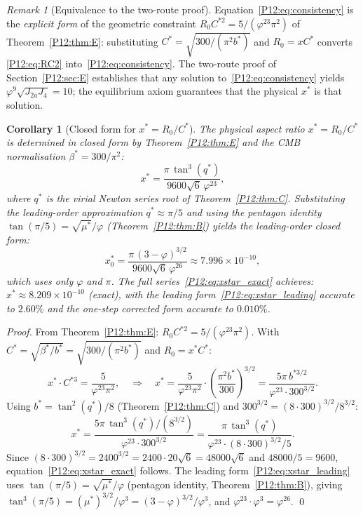 \documentclass[11pt,a4paper]{article}
\newtheorem{corollary}[theorem]{Corollary}
\theoremstyle{definition}
\theoremstyle{remark}
\newtheorem{remark}[theorem]{Remark}
\newcommand{\vp}{\varphi}
\newcommand{\bst}{\beta^{*}}
\newcommand{\Ja}{J_{2a}}
\newcommand{\Jfour}{J_{4}}
\newcommand{\ms}{\mu^{*}}
\begin{document}
\begin{remark}[Equivalence to the two-route proof]
\label{P12:rem:consistency_equiv}
Equation~\eqref{P12:eq:consistency} is the \emph{explicit form} of the
geometric constraint $R_0 C^{*2}=5/(\vp^{23}\pi^2)$ of Theorem~\ref{P12:thm:E}:
substituting $C^*=\sqrt{300/(\pi^2 b^*)}$ and $R_0=x C^*$ converts
\eqref{P12:eq:RC2} into~\eqref{P12:eq:consistency}.
The two-route proof of Section~\ref{P12:sec:E} establishes that any solution
to~\eqref{P12:eq:consistency} yields $\vp^9\sqrt{\Ja\Jfour}=10$;
the equilibrium axiom guarantees that the physical $x^*$ is that solution.
\end{remark}

\begin{corollary}[Closed form for $x^*=R_0/C^*$]
\label{P12:cor:xstar}
The physical aspect ratio $x^*=R_0/C^*$ is determined in closed form
by Theorem~\ref{P12:thm:E} and the CMB normalisation $\bst=300/\pi^2$:
\begin{equation}
  \boxed{x^* = \frac{\pi\,\tan^3(q^*)}{9600\sqrt{6}\,\vp^{23}},}
  \label{P12:eq:xstar_exact}
\end{equation}
where $q^*$ is the virial Newton series root of Theorem~\ref{P12:thm:C}.
Substituting the leading-order approximation $q^*\approx\pi/5$ and
using the pentagon identity $\tan(\pi/5)=\sqrt{\ms}/\vp$
(Theorem~\ref{P12:thm:B}) yields the leading-order closed form:
\begin{equation}
  \boxed{x^*_0 = \frac{\pi\,(3-\vp)^{3/2}}{9600\sqrt{6}\,\vp^{26}}
  \approx 7.996\times10^{-10},}
  \label{P12:eq:xstar_leading}
\end{equation}
which uses only $\vp$ and $\pi$.
The full series~\eqref{P12:eq:xstar_exact} achieves:
$x^*\approx8.209\times10^{-10}$ (exact),
with the leading form~\eqref{P12:eq:xstar_leading} accurate to $2.60\%$
and the one-step corrected form accurate to $0.010\%$.
\end{corollary}

\begin{proof}
From Theorem~\ref{P12:thm:E}: $R_0 C^{*2}=5/(\vp^{23}\pi^2)$.
With $C^*=\sqrt{\bst/b^*}=\sqrt{300/(\pi^2 b^*)}$ and $R_0=x^*\!C^*$:
\[
  x^*\!\cdot C^{*3} = \frac{5}{\vp^{23}\pi^2},
  \quad\Longrightarrow\quad
  x^* = \frac{5}{\vp^{23}\pi^2}\cdot\left(\frac{\pi^2 b^*}{300}\right)^{3/2}
      = \frac{5\pi\, b^{*3/2}}{\vp^{23}\cdot300^{3/2}}.
\]
Using $b^*=\tan^2(q^*)/8$ (Theorem~\ref{P12:thm:C}) and
$300^{3/2}=(8\cdot300)^{3/2}/8^{3/2}$:
\[
  x^* = \frac{5\pi\,\tan^3(q^*)/(8^{3/2})}{\vp^{23}\cdot300^{3/2}}
      = \frac{\pi\,\tan^3(q^*)}{\vp^{23}\cdot(8\cdot300)^{3/2}/5}.
\]
Since $(8\cdot300)^{3/2}=2400^{3/2}=2400\cdot20\sqrt{6}=48000\sqrt{6}$
and $48000/5=9600$, equation~\eqref{P12:eq:xstar_exact} follows.
The leading form~\eqref{P12:eq:xstar_leading} uses
$\tan(\pi/5)=\sqrt{\ms}/\vp$ (pentagon identity, Theorem~\ref{P12:thm:B}),
giving $\tan^3(\pi/5)=(\ms)^{3/2}/\vp^3=(3-\vp)^{3/2}/\vp^3$,
and $\vp^{23}\cdot\vp^3=\vp^{26}$.
\qed
\end{proof}
\end{document}
